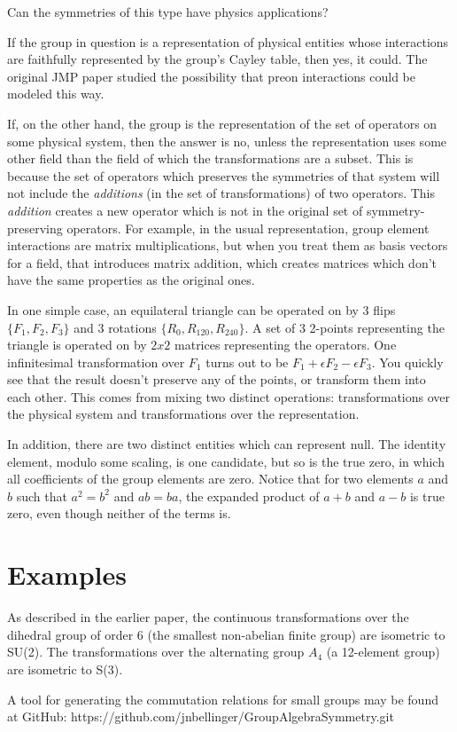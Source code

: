 \documentclass{revtex4-1}
\begin{document}
Can the symmetries of this type have physics applications?

\par If the group in question is a representation of physical
entities whose interactions are faithfully represented by the
group's Cayley table, then yes, it could.  The original JMP
paper studied the possibility that preon interactions could be
modeled this way.

\par  If, on the other hand, the group is the representation of the
set of operators
on some physical system, then the answer is no, unless the
representation uses some other field than the field of which
the transformations are a subset.  This is because
the set of operators which preserves the symmetries of that
system will not include the {\it additions} (in the set of transformations) 
of two operators.  This {\it addition} 
creates a new operator which is not in the original set of 
symmetry-preserving operators.  For example, in the usual
representation, group element interactions are matrix multiplications,
but when you treat them as basis vectors for a field, that introduces matrix
addition, which creates matrices which don't have the same 
properties as the original ones.

\par In one simple case, an equilateral
triangle can be operated on by 3 flips $\{ F_1, F_2, F_3 \}$
and 3 rotations $\{ R_0, R_{120}, R_{240} \}$.  A set of 3 2-points
representing the triangle is operated on by $2x2$ matrices
representing the operators.  One infinitesimal transformation over
$F_1$ turns out to be $F_1 + \epsilon F_2 - \epsilon F_3$.  You
quickly see that the result doesn't preserve any of the points, or
transform them into each other.  This comes from mixing two
distinct operations:  transformations over the physical system and
transformations over the representation.

\par In addition, there are two distinct entities which can represent
null.  The identity element, modulo some scaling, is one candidate,
but so is the true zero, in which all coefficients of the group elements
are zero.  Notice that for two elements $a$ and $b$ such that $a^2=b^2$
and $ab=ba$, the expanded product of $a+b$ and $a-b$ is true zero,
even though neither of the terms is.

\section{ Examples}
As described in the earlier paper, the continuous transformations over
the dihedral group of order 6 (the smallest non-abelian finite group) are
isometric to SU(2).  The transformations over the alternating group $A_4$
(a 12-element group) are isometric to S(3).  

\par A tool for generating the commutation relations for small groups
may be found at GitHub:  https://github.com/jnbellinger/GroupAlgebraSymmetry.git
\end{document}
